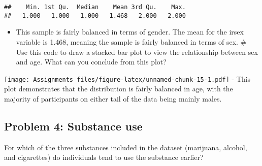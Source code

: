 \documentclass[
]{article}
\newenvironment{Shaded}{\begin{snugshade}}{\end{snugshade}}
\newcommand{\AttributeTok}[1]{\textcolor[rgb]{0.77,0.63,0.00}{#1}}
\newcommand{\CommentTok}[1]{\textcolor[rgb]{0.56,0.35,0.01}{\textit{#1}}}
\newcommand{\ConstantTok}[1]{\textcolor[rgb]{0.00,0.00,0.00}{#1}}
\newcommand{\FunctionTok}[1]{\textcolor[rgb]{0.00,0.00,0.00}{#1}}
\newcommand{\NormalTok}[1]{#1}
\newcommand{\OtherTok}[1]{\textcolor[rgb]{0.56,0.35,0.01}{#1}}
\newcommand{\SpecialCharTok}[1]{\textcolor[rgb]{0.00,0.00,0.00}{#1}}
\newcommand{\StringTok}[1]{\textcolor[rgb]{0.31,0.60,0.02}{#1}}
\providecommand{\tightlist}{%
  \setlength{\itemsep}{0pt}\setlength{\parskip}{0pt}}
\begin{document}
\begin{verbatim}
##    Min. 1st Qu.  Median    Mean 3rd Qu.    Max. 
##   1.000   1.000   1.000   1.468   2.000   2.000
\end{verbatim}

\begin{itemize}
\tightlist
\item
  This sample is fairly balanced in terms of gender. The mean for the
  irsex variable is 1.468, meaning the sample is fairly balanced in
  terms of sex. \# Use this code to draw a stacked bar plot to view the
  relationship between sex and age. What can you conclude from this
  plot?
\end{itemize}

\begin{Shaded}
\end{Shaded}

\texttt{[image: Assignments\_files/figure-latex/unnamed-chunk-15-1.pdf]}
- This plot demonstrates that the distribution is fairly balanced in
age, with the majority of participants on either tail of the data being
mainly males.

\hypertarget{problem-4-substance-use}{%
\subsection{Problem 4: Substance use}\label{problem-4-substance-use}}

For which of the three substances included in the dataset (marijuana,
alcohol, and cigarettes) do individuals tend to use the substance
earlier?
\end{document}
